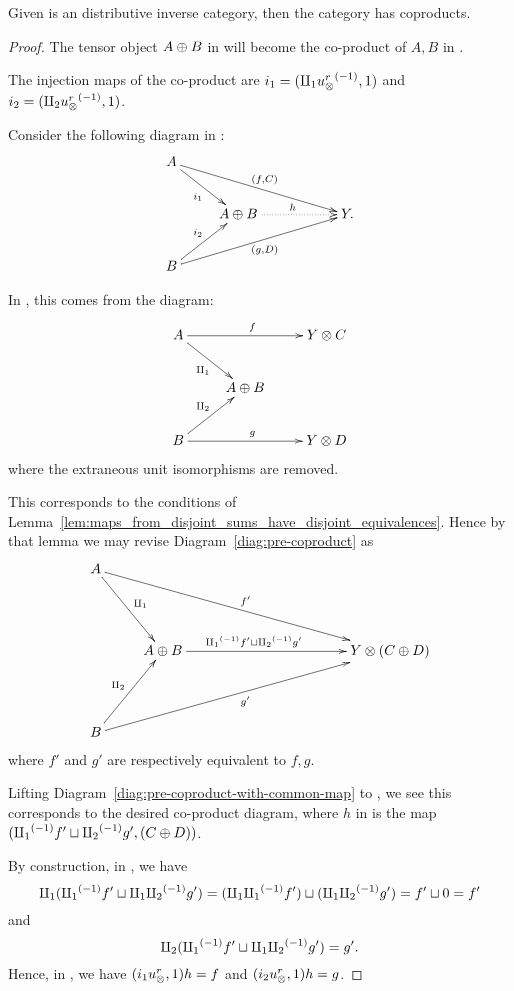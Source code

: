 \begin{proposition}\label{thm:x_tilde_has_coproducts_if_x_is_inverse_distributive_category}
  Given \X is an distributive inverse category, then the category \Xt has coproducts.
\end{proposition}
\begin{proof}
  The tensor object $A\oplus B$ in \X will become the co-product of $A, B$ in \Xt.

  The injection maps of the co-product are $i_1 =(\amalg_{1} {u_{\otimes}^r}^{(-1)}, 1)$ and
  $i_2 = (\amalg_{2} {u_{\otimes}^r}^{(-1)}, 1)$.

  Consider the following diagram in \Xt:
  \[
    \xymatrix{
      A \ar[drrr]^{(f,C)} \ar[dr]_{i_1} \\
      & A\+B \ar@{.>}[rr]^h & & Y. \\
      B \ar[urrr]_{(g,D)} \ar[ur]^{i_2}
    }
  \]

  In \X, this comes from the diagram:
  \begin{equation}
    \xymatrix{
      A \ar[dr]_{\cpa} \ar[rr]^f && Y\*C\\
      & A\+B\\
      B \ar[ur]^{\cpb} \ar[rr]^g && Y\*D\\
    }\label{diag:pre-coproduct}
  \end{equation}
  where the extraneous unit isomorphisms are removed.

  This corresponds to the conditions of
  Lemma~\ref{lem:maps_from_disjoint_sums_have_disjoint_equivalences}. Hence by that lemma we may
  revise Diagram~\ref{diag:pre-coproduct} as
  \begin{equation}
    \xymatrix@R+20pt {
      A \ar[dr]^{\cpa} \ar[drrrrr]^{f'}\\
      &A\+B \ar[rrrr]^(.4){\icpa f' \djoin \icpb g'} &&&& Y\*(C\+D)\\
      B \ar[ur]^{\cpb} \ar[urrrrr]_{g'}\\
    }\label{diag:pre-coproduct-with-common-map}
  \end{equation}
  where $f'$ and $g'$ are respectively equivalent to $f,g$.

  Lifting Diagram~\ref{diag:pre-coproduct-with-common-map} to \X, we see this corresponds to the
  desired co-product diagram, where  $h$ in \Xt is the map $({\amalg_{1}}^{(-1)} f' \sqcup {\amalg_{2}}^{(-1)} g', (C\oplus D))$.

  By construction, in \X, we have
  \[
    \amalg_{1} ({\amalg_{1}}^{(-1)} f' \sqcup \amalg_{1}{\amalg_{2}}^{(-1)} g') = (\amalg_{1}{\amalg_{1}}^{(-1)} f') \sqcup (\amalg_{1}{\amalg_{2}}^{(-1)} g') = f' \sqcup 0 = f'
  \]
  and
  \[
    \amalg_{2} ({\amalg_{1}}^{(-1)} f' \sqcup \amalg_{1}{\amalg_{2}}^{(-1)} g') = g'.
  \]
  Hence, in \Xt, we have  $(i_1 u_{\otimes}^r, 1) h = f$ and $(i_2 u_{\otimes}^r, 1) h = g$.


\end{proof}
